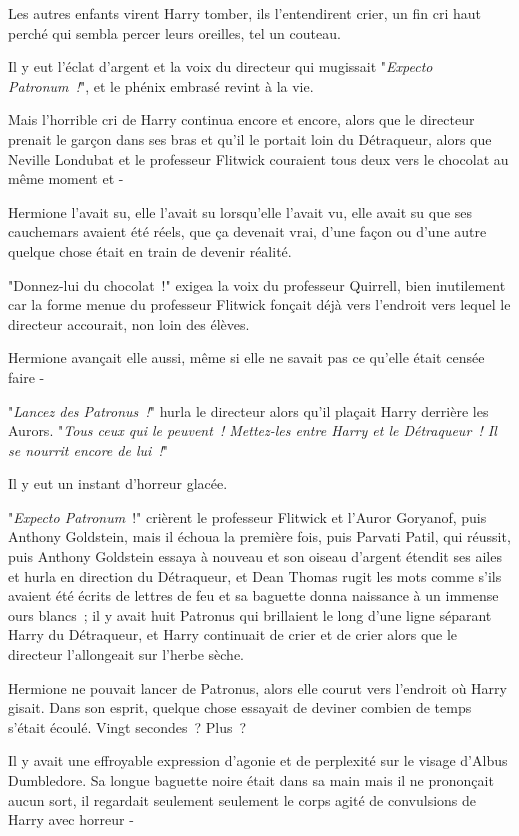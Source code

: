 \later

Les autres enfants virent Harry tomber, ils l'entendirent crier, un fin cri haut perché qui sembla percer leurs oreilles, tel un couteau.

Il y eut l'éclat d'argent et la voix du directeur qui mugissait "\emph{Expecto Patronum~!}", et le phénix embrasé revint à la vie.

Mais l'horrible cri de Harry continua encore et encore, alors que le directeur prenait le garçon dans ses bras et qu'il le portait loin du Détraqueur, alors que Neville Londubat et le professeur Flitwick couraient tous deux vers le chocolat au même moment et -

Hermione l'avait su, elle l'avait su lorsqu'elle l'avait vu, elle avait su que ses cauchemars avaient été réels, que ça devenait vrai, d'une façon ou d'une autre quelque chose était en train de devenir réalité.

"Donnez-lui du chocolat~!" exigea la voix du professeur Quirrell, bien inutilement car la forme menue du professeur Flitwick fonçait déjà vers l'endroit vers lequel le directeur accourait, non loin des élèves.

Hermione avançait elle aussi, même si elle ne savait pas ce qu'elle était censée faire -

"\emph{Lancez des Patronus~!}" hurla le directeur alors qu'il plaçait Harry derrière les Aurors. "\emph{Tous ceux qui le peuvent~! Mettez-les entre Harry et le Détraqueur~! Il se nourrit encore de lui~!}"

Il y eut un instant d'horreur glacée.

"\emph{Expecto Patronum}~!" crièrent le professeur Flitwick et l'Auror Goryanof, puis Anthony Goldstein, mais il échoua la première fois, puis Parvati Patil, qui réussit, puis Anthony Goldstein essaya à nouveau et son oiseau d'argent étendit ses ailes et hurla en direction du Détraqueur, et Dean Thomas rugit les mots comme s'ils avaient été écrits de lettres de feu et sa baguette donna naissance à un immense ours blancs~; il y avait huit Patronus qui brillaient le long d'une ligne séparant Harry du Détraqueur, et Harry continuait de crier et de crier alors que le directeur l'allongeait sur l'herbe sèche.

Hermione ne pouvait lancer de Patronus, alors elle courut vers l'endroit où Harry gisait. Dans son esprit, quelque chose essayait de deviner combien de temps s'était écoulé. Vingt secondes~? Plus~?

Il y avait une effroyable expression d'agonie et de perplexité sur le visage d'Albus Dumbledore. Sa longue baguette noire était dans sa main mais il ne prononçait aucun sort, il regardait seulement seulement le corps agité de convulsions de Harry avec horreur -

